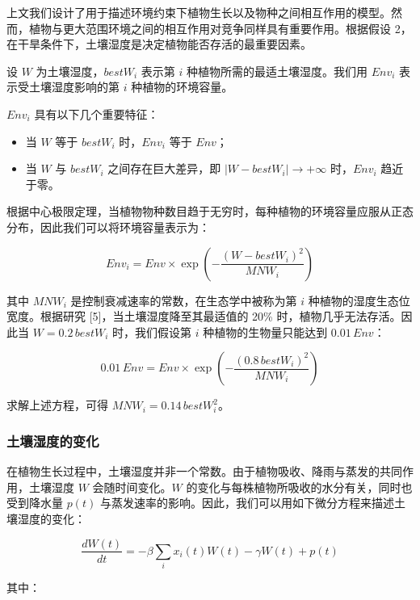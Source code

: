 \documentclass[11pt,a4paper]{ctexart}
\begin{document}
上文我们设计了用于描述环境约束下植物生长以及物种之间相互作用的模型。然而，植物与更大范围环境之间的相互作用对竞争同样具有重要作用。根据假设 2，在干旱条件下，土壤湿度是决定植物能否存活的最重要因素。

设 $W$ 为土壤湿度，$bestW_i$ 表示第 $i$ 种植物所需的最适土壤湿度。我们用 $Env_i$ 表示受土壤湿度影响的第 $i$ 种植物的环境容量。

$Env_i$ 具有以下几个重要特征：

\begin{itemize}
\item 当 $W$ 等于 $bestW_i$ 时，$Env_i$ 等于 $Env$；
\item 当 $W$ 与 $bestW_i$ 之间存在巨大差异，即 $|W-bestW_i|\to+\infty$ 时，$Env_i$ 趋近于零。
\end{itemize}

根据中心极限定理，当植物物种数目趋于无穷时，每种植物的环境容量应服从正态分布，因此我们可以将环境容量表示为：

\begin{equation}
Env_i=Env\times\exp\left(-\frac{(W-bestW_i)^2}{MNW_i}\right)
\label{eq:envcap}
\end{equation}

其中 $MNW_i$ 是控制衰减速率的常数，在生态学中被称为第 $i$ 种植物的湿度生态位宽度。根据研究 [5]，当土壤湿度降至其最适值的 20\% 时，植物几乎无法存活。因此当 $W=0.2\,bestW_i$ 时，我们假设第 $i$ 种植物的生物量只能达到 $0.01\,Env$：

\begin{equation}
0.01\,Env=Env\times\exp\left(-\frac{(0.8\,bestW_i)^2}{MNW_i}\right)
\label{eq:mnw}
\end{equation}

求解上述方程，可得 $MNW_i=0.14\,bestW_i^{2}$。

\subsubsection{土壤湿度的变化}

在植物生长过程中，土壤湿度并非一个常数。由于植物吸收、降雨与蒸发的共同作用，土壤湿度 $W$ 会随时间变化。$W$ 的变化与每株植物所吸收的水分有关，同时也受到降水量 $p(t)$ 与蒸发速率的影响。因此，我们可以用如下微分方程来描述土壤湿度的变化：

\begin{equation}
\frac{dW(t)}{dt}=-\beta\sum_{i}x_i(t)W(t)-\gamma W(t)+p(t)
\label{eq:soilwater}
\end{equation}

其中：
\end{document}
